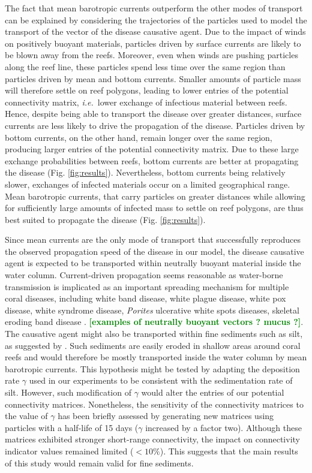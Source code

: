 \documentclass[utf8]{frontiersSCNS}
\newcommand{\ie}{{\it i.e.}\ }
\newcommand{\erinn}[1]{\textbf{\textcolor{green}{#1}}}
\begin{document}
The fact that mean barotropic currents outperform the other modes of transport can be explained by considering the trajectories of the particles used to model the transport of the vector of the disease causative agent. Due to the impact of winds on positively buoyant materials, particles driven by surface currents are likely to be blown away from the reefs. Moreover, even when winds are pushing particles along the reef line, these particles spend less time over the same region than particles driven by mean and bottom currents. Smaller amounts of particle mass will therefore settle on reef polygons, leading to lower entries of the potential connectivity matrix, \ie lower exchange of infectious material between reefs. Hence, despite being able to transport the disease over greater distances, surface currents are less likely to drive the propagation of the disease. Particles driven by bottom currents, on the other hand, remain longer over the same region, producing larger entries of the potential connectivity matrix. Due to these large exchange probabilities between reefs, bottom currents are better at propagating the disease (Fig. \ref{fig:results}). Nevertheless, bottom currents being relatively slower, exchanges of infected materials occur on a limited geographical range. Mean barotropic currents, that carry particles on greater distances while allowing for sufficiently large amounts of infected mass to settle on reef polygons, are thus best suited to propagate the disease (Fig. \ref{fig:results}).

Since mean currents are the only mode of transport that successfully reproduces the observed propagation speed of the disease in our model, the disease causative agent is expected to be transported within neutrally buoyant material inside the water column. Current-driven propagation seems reasonable as water-borne transmission is implicated as an important spreading mechanism for multiple coral diseases, including white band disease, white plague disease, white pox disease, white syndrome disease, \textit{Porites} ulcerative white spots diseases, skeletal eroding band disease \citep{shore2019modes}. \erinn{[examples of neutrally buoyant vectors ? mucus ?]}. The causative agent might also be transported within fine sediments such as silt, as suggested by \cite{rosales2020rhodobacterales}. Such sediments are easily eroded in shallow areas around coral reefs and would therefore be mostly transported inside the water column by mean barotropic currents. This hypothesis might be tested by adapting the deposition rate $\gamma$ used in our experiments to be consistent with the sedimentation rate of silt. However, such modification of $\gamma$ would alter the entries of our potential connectivity matrices. Nonetheless, the sensitivity of the connectivity matrices to the value of $\gamma$ has been briefly assessed by generating new matrices using particles with a half-life of 15 days ($\gamma$ increased by a factor two). Although these matrices exhibited stronger short-range connectivity, the impact on connectivity indicator values remained  limited ($<10\%$). This suggests that the main results of this study would remain valid for fine sediments.  
\end{document}
